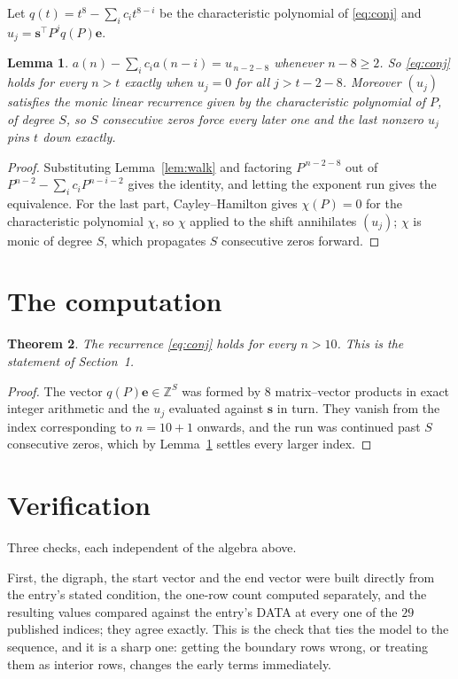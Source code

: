 \documentclass[11pt,a4paper]{article}
\theoremstyle{plain}
\newtheorem{theorem}{Theorem}
\newtheorem{lemma}[theorem]{Lemma}
\theoremstyle{definition}
\begin{document}
Let $q(t)=t^{8}-\sum_i c_i t^{8-i}$ be the characteristic polynomial of
\eqref{eq:conj} and $u_j=\mathbf{s}^{\!\top}P^{j}q(P)\mathbf{e}$.

\begin{lemma}\label{lem:crit}
$a(n)-\sum_i c_i a(n-i)=u_{\,n-2-8}$ whenever $n-8\ge2$. So \eqref{eq:conj}
holds for every $n>t$ exactly when $u_j=0$ for all $j>t-2-8$. Moreover $(u_j)$
satisfies the monic linear recurrence given by the characteristic polynomial of $P$, of
degree $S$, so $S$ consecutive zeros force every later one and the last nonzero $u_j$ pins
$t$ down exactly.
\end{lemma}

\begin{proof}
Substituting Lemma~\ref{lem:walk} and factoring $P^{\,n-2-8}$ out of
$P^{n-2}-\sum_i c_i P^{n-i-2}$ gives the identity, and letting the exponent run gives the
equivalence. For the last part, Cayley--Hamilton gives $\chi(P)=0$ for the characteristic
polynomial $\chi$, so $\chi$ applied to the shift annihilates $(u_j)$; $\chi$ is monic of
degree $S$, which propagates $S$ consecutive zeros forward.
\end{proof}

\section{The computation}

\begin{theorem}
The recurrence \eqref{eq:conj} holds for every $n>10$. This is the statement of
Section~1.
\end{theorem}

\begin{proof}
The vector $q(P)\mathbf{e}\in\mathbb{Z}^{S}$ was formed by $8$ matrix--vector
products in exact integer arithmetic and the $u_j$ evaluated against $\mathbf{s}$ in turn.
They vanish from the index corresponding to $n=10+1$ onwards, and the run was continued
past $S$ consecutive zeros, which by Lemma~\ref{lem:crit} settles every larger index.
\end{proof}

\section{Verification}

Three checks, each independent of the algebra above.

First, the digraph, the start vector and the end vector were built directly from the
entry's stated condition, the one-row count computed separately, and the resulting values
compared against the entry's DATA at every one of the $29$ published indices; they
agree exactly. This is the check that ties the model to the sequence, and it is a sharp one:
getting the boundary rows wrong, or treating them as interior rows, changes the early terms
immediately.
\end{document}
